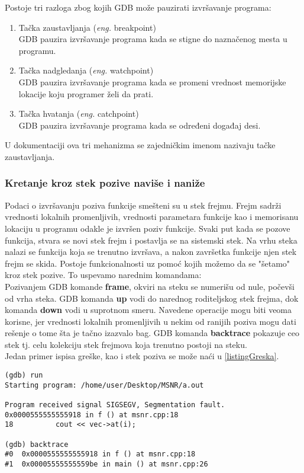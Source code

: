 \documentclass[a4paper]{article}
\begin{document}
Postoje tri razloga zbog kojih GDB može pauzirati izvršavanje programa\cite{art_debugging}:
\begin{enumerate}
\item Tačka zaustavljanja (\textit{eng.} breakpoint) \\
GDB pauzira izvršavanje programa kada se stigne do naznačenog mesta u programu.
\item Tačka nadgledanja (\textit{eng.} watchpoint) \\ 
GDB pauzira izvršavanje programa kada se promeni vrednost memorijske lokacije koju programer želi da prati.
\item Tačka hvatanja (\textit{eng.} catchpoint) \\
GDB pauzira izvršavanje programa kada se određeni događaj desi.
\end{enumerate}
U dokumentaciji ova tri mehanizma se zajedničkim imenom nazivaju tačke zaustavljanja.

\subsubsection{Kretanje kroz stek pozive naviše i naniže}
\label{subsec:debager_stek}

Podaci o izvršavanju poziva funkcije smešteni su u stek frejmu. Frejm
sadrži vrednosti lokalnih promenljivih, vrednosti parametara funkcije kao
i memorisanu lokaciju u programu odakle je izvršen poziv funkcije. Svaki
put kada se pozove funkcija, stvara se novi stek frejm i postavlja se na
sistemski stek. Na vrhu steka nalazi se funkcija koja se trenutno izvršava,
a nakon završetka funkcije njen stek frejm se skida.
Postoje funkcionalnosti uz pomoć kojih možemo da se "šetamo"{} kroz stek pozive.
To uspevamo narednim komandama: \\
Pozivanjem GDB komande \textbf{frame}, okviri na steku se numerišu od nule, počevši
od vrha steka. GDB komanda \textbf{up} vodi do narednog roditeljskog stek frejma, dok komanda \textbf{down} 
vodi u suprotnom smeru. Navedene operacije mogu biti veoma korisne, jer vrednosti lokalnih 
promenljivih u nekim od ranijih poziva mogu dati rešenje o tome šta je tačno izazvalo bag. 
GDB komanda \textbf{backtrace} pokazuje ceo stek tj. celu kolekciju stek frejmova koja trenutno postoji na steku\cite{art_debugging}.\\
Jedan primer ispisa greške, kao i stek poziva se može naći u \ref{listingGreska}.


\begin{lstlisting}[caption={Primer ispisa greške u konzoli},frame=single, label=listingGreska]
(gdb) run
Starting program: /home/user/Desktop/MSNR/a.out 

Program received signal SIGSEGV, Segmentation fault.
0x0000555555555918 in f () at msnr.cpp:18
18	        cout << vec->at(i);

(gdb) backtrace
#0  0x0000555555555918 in f () at msnr.cpp:18
#1  0x00005555555559be in main () at msnr.cpp:26
\end{lstlisting}
\end{document}
